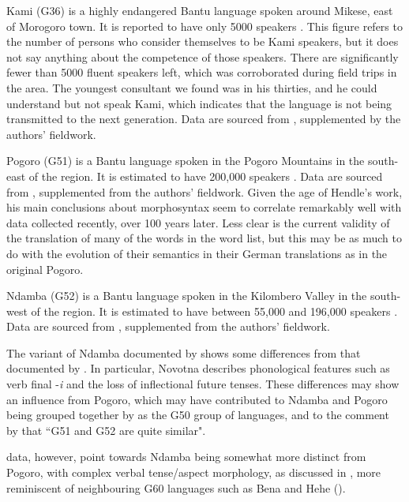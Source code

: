 \documentclass[output=paper,
            colorlinks, citecolor=brown
            ,draftmode
		  ]{langscibook}
\begin{document}
Kami (G36) is a highly endangered Bantu language spoken around Mikese, east of Morogoro town. It is reported to have only 5000 speakers \citep{LanguagesofTanzaniaProject2009}. This figure refers to the number of persons who consider themselves to be Kami speakers, but it does not say anything about the competence of those speakers. There are significantly fewer than 5000 fluent speakers left, which was corroborated during field trips in the area. The youngest consultant we found was in his thirties, and he could understand but not speak Kami, which indicates that the language is not being transmitted to the next generation. Data are sourced from \citet{PetzellAunio2019}, supplemented by the authors' fieldwork.



Pogoro (G51) is a Bantu language spoken in the Pogoro Mountains in the south-east of the region. It is estimated to have 200,000 speakers \citep{LanguagesofTanzaniaProject2009}. Data are sourced from \citet{Hendle1907}, supplemented from the authors' fieldwork. Given the age of Hendle's work, his main conclusions about morphosyntax seem to correlate remarkably well with data collected recently, over 100 years later. Less clear is the current validity of the translation of many of the words in the word list, but this may be as much to do with the evolution of their semantics in their German translations as in the original Pogoro.



Ndamba (G52) is a Bantu language spoken in the Kilombero Valley in the south-west of the region. It is estimated to have between 55,000 \citep{Lewis2009} and 196,000 speakers \citep{LanguagesofTanzaniaProject2009}. Data are sourced from \citet{EdelstenLijongwa2010}, supplemented from the authors' fieldwork.



The variant of Ndamba documented by \citet{Novotna2005} shows some differences from that documented by \citet{EdelstenLijongwa2010}. In particular, Novotna describes phonological features such as verb final -\textit{i} and the loss of inflectional future tenses. These differences may show an influence from Pogoro, which may have contributed to Ndamba and Pogoro being grouped together by \citet{Guthrie1948} as the G50 group of languages, and to the comment by \citet[Appendix 1, p. 177]{Nurse2008} that “G51 and G52 are quite similar".



 data, however, point towards Ndamba being somewhat more distinct from Pogoro, with complex verbal tense/aspect morphology, as discussed in , more reminiscent of neighbouring G60 languages such as Bena \citep{Morrison2011} and Hehe (\citealt[Appendix 1, pp. 178--180]{Nurse2008}).
\end{document}
